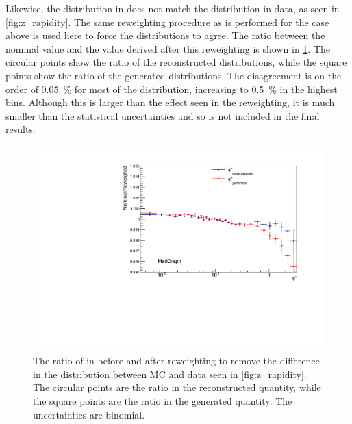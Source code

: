 Likewise, the \Z \rapidity distribution in \MADGRAPH does not match the
distribution in data, as seen in \cref{fig:z_rapidity}. The same reweighting
procedure as is performed for the \mee case above is used here to force the
distributions to agree. The ratio between the nominal \phistar value and the
value derived after this reweighting is shown in
\cref{fig:z_rapidity_reweighted}. The circular points show the ratio of the
reconstructed \phistar distributions, while the square points show the ratio of
the generated \phistar distributions. The disagreement is on the order of
\SI{0.05}{\percent} for most of the distribution, increasing to
\SI{0.5}{\percent} in the highest \phistar bins. Although this is larger than
the effect seen in the \mee reweighting, it is much smaller than the
statistical uncertainties and so is not included in the final results.

\begin{figure}[!htbp]
    \centering
    \includegraphics[width=\textwidth]{figures/ZY_reweighed.pdf}
    \caption[
        The ratio of \phistar in \MADGRAPH before and after reweighting to
        remove the differnce in the \rapidity distribution between MC and data.
    ]{
        The ratio of \phistar in \MADGRAPH before and after reweighting to
        remove the difference in the \rapidity distribution between MC and data
        seen in \cref{fig:z_rapidity}. The circular points are the ratio in
        the reconstructed quantity, while the square points are the ratio in
        the generated quantity. The uncertainties are binomial.
    }
    \label{fig:z_rapidity_reweighted}
\end{figure}

